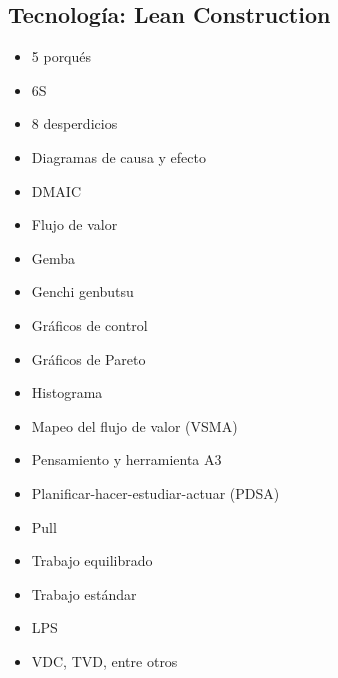 \newpage

\subsection*{Tecnología: Lean Construction}

\begin{multicols}{2}
    \begin{itemize}
        \item 5 porqués
        \item 6S
        \item 8 desperdicios
        \item Diagramas de causa y efecto
        \item DMAIC
        \item Flujo de valor
        \item Gemba
        \item Genchi genbutsu
        \item Gráficos de control
        \item Gráficos de Pareto
        \item Histograma
        \item Mapeo del flujo de valor (VSMA)
        \item Pensamiento y herramienta A3
        \item Planificar-hacer-estudiar-actuar (PDSA)
        \item Pull
        \item Trabajo equilibrado
        \item Trabajo estándar
        \item LPS
        \item VDC, TVD, entre otros
    \end{itemize}
\end{multicols}




